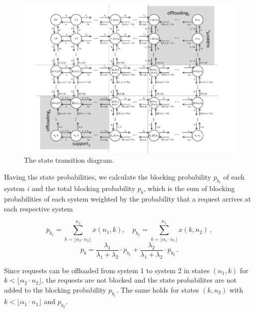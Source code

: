 \begin{figure}[tb]
	\centering
 	\includegraphics[width=1.0\textwidth]{aggregation/performance_model/figures/states}
  	\caption{The state transition diagram.}
  	\label{fig:statetransitions}
\end{figure}

Having the state probabilities, we calculate the blocking probability $p_{b_i}$ of each system $i$ and the total blocking probability $p_b$, which is the sum of blocking probabilities of each system weighted by the probability that a request arrives at each respective system

\begin{equation}
p_{b_1} = \sum_{k=\lfloor\alpha_2\cdot n_2\rfloor}^{n_2} x(n_1,k),\quad p_{b_2} = \sum_{k=\lfloor\alpha_1\cdot n_1\rfloor}^{n_1} x(k,n_2) \, ,
\end{equation}
\begin{equation}
 p_{b} = \frac{\lambda_1}{\lambda_1+\lambda_2}\cdot p_{b_1}+\frac{\lambda_2}{\lambda_1+\lambda_2}\cdot p_{b_2} \, .
\end{equation}

Since requests can be offloaded from system 1 to system 2 in states $(n_1, k)$ for $k<\lfloor\alpha_2\cdot n_2\rfloor$, the requests are not blocked and the state probabilites are not added to the blocking probability $p_{b_1}$. The same holds for states $(k, n_2)$ with $k<\lfloor\alpha_1\cdot n_1\rfloor$ and $p_{b_2}$.

%
%
%

